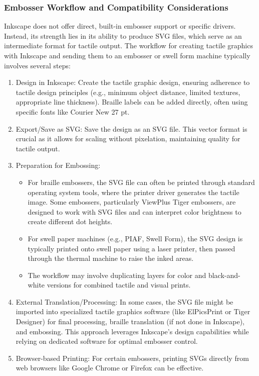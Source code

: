 \subsubsection{Embosser Workflow and Compatibility Considerations}

Inkscape does not offer direct, built-in embosser support or specific drivers. Instead, its strength lies in its ability to produce SVG files, which serve as an intermediate format for tactile output.\cite{ProBlindCreate,NimProQuick} The workflow for creating tactile graphics with Inkscape and sending them to an embosser or swell form machine typically involves several steps:

\begin{enumerate}
    \item Design in Inkscape: Create the tactile graphic design, ensuring adherence to tactile design principles (e.g., minimum object distance, limited textures, appropriate line thickness).\cite{ProBlindCreate,DuxburyDBTDetails} Braille labels can be added directly, often using specific fonts like Courier New 27 pt.\cite{GetBraille}
    \item Export/Save as SVG: Save the design as an SVG file.\cite{ProBlindCreate} This vector format is crucial as it allows for scaling without pixelation, maintaining quality for tactile output.\cite{BlindHelpDBT}
    \item Preparation for Embossing:
    \begin{itemize}
        \item For braille embossers, the SVG file can often be printed through standard operating system tools, where the printer driver generates the tactile image.\cite{IrieTactileView} Some embossers, particularly ViewPlus Tiger embossers, are designed to work with SVG files and can interpret color brightness to create different dot heights.\cite{ProBlindCreate,DuxburyProducts,IrieBrailleTrac}
        \item For swell paper machines (e.g., PIAF, Swell Form), the SVG design is typically printed onto swell paper using a laser printer, then passed through the thermal machine to raise the inked areas.\cite{DuxburyProducts,NimProQuick}
        \item The workflow may involve duplicating layers for color and black-and-white versions for combined tactile and visual prints.\cite{NimProQuick}
    \end{itemize}
    \item External Translation/Processing: In some cases, the SVG file might be imported into specialized tactile graphics software (like ElPicsPrint or Tiger Designer) for final processing, braille translation (if not done in Inkscape), and embossing.\cite{DuxburyDBTDetails,ElitaElPicsPrint} This approach leverages Inkscape's design capabilities while relying on dedicated software for optimal embosser control.
    \item Browser-based Printing: For certain embossers, printing SVGs directly from web browsers like Google Chrome or Firefox can be effective.\cite{ProBlindCreate}
\end{enumerate}

